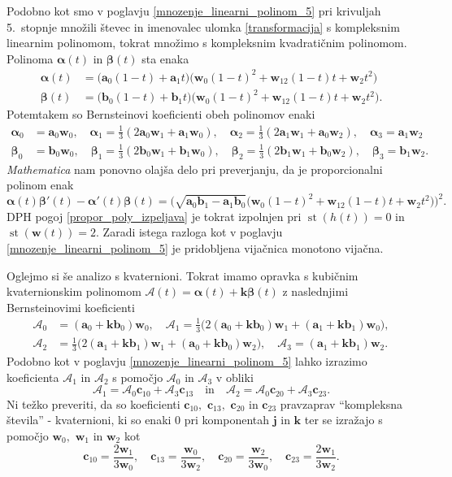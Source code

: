 \documentclass[12pt,a4paper,twoside]{article}
\theoremstyle{definition} %
\theoremstyle{plain} %
\numberwithin{equation}{section}  %
\newcommand{\aV}{\mathbf{a}}
\newcommand{\bV}{\mathbf{b}}
\newcommand{\cV}{\mathbf{c}}
\newcommand{\jV}{\mathbf{j}}
\newcommand{\kV}{\mathbf{k}}
\newcommand{\wV}{\mathbf{w}}
\newcommand{\AQ}{\mathcal{A}}
\newcommand{\balpha}{\boldsymbol \alpha}
\newcommand{\bbeta}{\boldsymbol \beta}
\DeclareMathOperator{\st}{st}
\begin{document}
Podobno kot smo v poglavju \ref{mnozenje_linearni_polinom_5} pri krivuljah 5.\ stopnje množili števec in imenovalec ulomka \eqref{transformacija} s kompleksnim linearnim polinomom, tokrat množimo s kompleksnim kvadratičnim polinomom. Polinoma $\balpha(t)$ in $\bbeta(t)$ sta enaka
\begin{align}
	\balpha(t)&=\big(\aV_0(1-t)+\aV_1t\big)\big(\wV_0(1-t)^2+\wV_12(1-t)t+\wV_2t^2\big)\nonumber\\
	\bbeta(t)&=\big(\bV_0(1-t)+\bV_1t\big)\big(\wV_0(1-t)^2+\wV_12(1-t)t+\wV_2t^2\big).
\end{align}
Potemtakem so Bernsteinovi koeficienti obeh polinomov enaki
\begin{align*}
	\balpha_0&=\aV_0\wV_0,\quad\balpha_1=\frac{1}{3}(2\aV_0\wV_1+\aV_1\wV_0),\quad\balpha_2=\frac{1}{3}(2\aV_1\wV_1+\aV_0\wV_2),\quad\balpha_3=\aV_1\wV_2\\
	\bbeta_0&=\bV_0\wV_0,\quad\bbeta_1=\frac{1}{3}(2\bV_0\wV_1+\bV_1\wV_0),\quad\bbeta_2=\frac{1}{3}(2\bV_1\wV_1+\bV_0\wV_2),\quad\bbeta_3=\bV_1\wV_2.
\end{align*}
\emph{Mathematica} nam ponovno olajša delo pri preverjanju, da je proporcionalni polinom enak
\begin{equation*}
	\balpha(t)\bbeta'(t)-\balpha'(t)\bbeta(t)=\big(\sqrt{\aV_0\bV_1-\aV_1\bV_0}\big(\wV_0(1-t)^2+\wV_12(1-t)t+\wV_2t^2\big)\big)^2.
\end{equation*}
DPH pogoj \eqref{propor_poly_izpeljava} je tokrat izpolnjen pri $\st(h(t))=0$ in $\st(\wV(t))=2.$ Zaradi istega razloga kot v poglavju \ref{mnozenje_linearni_polinom_5} je pridobljena vijačnica monotono vijačna.

Oglejmo si še analizo s kvaternioni. Tokrat imamo opravka s kubičnim kvaternionskim polinomom $\AQ(t)=\balpha(t)+\kV\bbeta(t)$ z naslednjimi Bernsteinovimi koeficienti
\begin{align*}
	\AQ_0&=(\aV_0+\kV\bV_0)\wV_0,\quad\AQ_1=\frac{1}{3}\big(2(\aV_0+\kV\bV_0)\wV_1+(\aV_1+\kV\bV_1)\wV_0\big),\\
	\AQ_2&=\frac{1}{3}\big(2(\aV_1+\kV\bV_1)\wV_1+(\aV_0+\kV\bV_0)\wV_2\big),\quad\AQ_3=(\aV_1+\kV\bV_1)\wV_2.
\end{align*}
Podobno kot v poglavju \ref{mnozenje_linearni_polinom_5} lahko izrazimo koeficienta $\AQ_1$ in $\AQ_2$ s pomočjo $\AQ_0$ in $\AQ_3$ v obliki
\begin{equation}
	\AQ_1=\AQ_0\cV_{10}+\AQ_3\cV_{13}\quad\text{in}\quad\AQ_2=\AQ_0\cV_{20}+\AQ_3\cV_{23}.
\end{equation}
Ni težko preveriti, da so koeficienti $\cV_{10},$ $\cV_{13},$ $\cV_{20}$ in $\cV_{23}$ pravzaprav ``kompleksna števila'' - kvaternioni, ki so enaki 0 pri komponentah $\jV$ in $\kV$ ter se izražajo s pomočjo $\wV_0,$ $\wV_1$ in $\wV_2$ kot
\begin{equation}
	\cV_{10}=\frac{2\wV_1}{3\wV_0},\quad\cV_{13}=\frac{\wV_0}{3\wV_2},\quad\cV_{20}=\frac{\wV_2}{3\wV_0},\quad\cV_{23}=\frac{2\wV_1}{3\wV_2}.
\end{equation}
\end{document}
